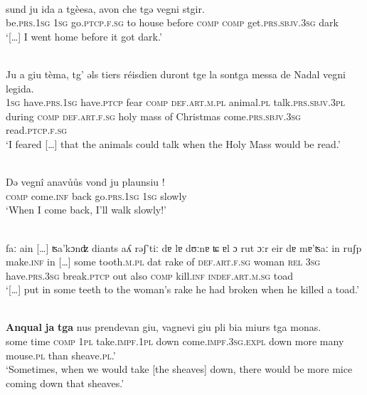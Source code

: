 \ea\label{ex:1:}
 {\citealt[17]{Büchli1966}}\\
\gll    sund ju ida a tgèesa, avon che tgǝ vegni stgir.\\
     be.\textsc{prs.1sg} \textsc{1sg} go.\textsc{ptcp.f.sg} to house before \textsc{comp} \textsc{comp} get.\textsc{prs.sbjv.3sg} dark \\
\glt `[…] I went home before it got dark.'
\z

\ea\label{ex:1:}
 {\citealt[19]{Büchli1966}}\\
\gll    Ju a giu tèma, tg’ ǝls tiers réisdien duront tge la sontga messa de Nadal vegni legida.\\
      \textsc{1sg} have.\textsc{prs.1sg} have.\textsc{ptcp} fear \textsc{comp} \textsc{def.art.m.pl} animal.\textsc{pl} talk.\textsc{prs.sbjv.3pl} during \textsc{comp} \textsc{def.art.f.sg} holy mass of Christmas come.\textsc{prs.sbjv.3sg} read.\textsc{ptcp.f.sg}\\
\glt `I feared […] that the animals could talk when the Holy Mass would be read.'
\z

\ea\label{}
\\
\gll    Dǝ vegnî anavůůs vond ju plaunsiu !\\
    \textsc{comp} come.\textsc{inf} back go.\textsc{prs.1sg} \textsc{1sg} slowly \\
\glt `When I come back, I’ll walk slowly!'
\z

\ea\label{}
\\
\gll    […] faː ain […] ʦa’kɔnʣ diants aʎ rǝʃ’tiː dɐ lɐ dʊːnɐ ʨ ɐl ɔ rut ɔːr eir dɐ mɐ’ʦaː in ruʃp\\
    […] make.\textsc{inf} in […] some tooth.\textsc{m.pl} {dat} rake of \textsc{def.art.f.sg} woman \textsc{rel} \textsc{3sg} have.\textsc{prs.3sg} break.\textsc{ptcp} out also \textsc{comp} kill.\textsc{inf} \textsc{indef.art.m.sg} toad\\
\glt `[…] put in some teeth to the woman’s rake he had broken when he killed a toad.'
\z

\ea\label{}
\\
\gll \textbf{Anqual} \textbf{ja} \textbf{tga} nus prendevan giu, vagnevi giu pli bia miurs tga monas.\\
   some time \textsc{comp} \textsc{1pl} take.\textsc{impf.1pl} down come.\textsc{impf.3sg.expl} down more many mouse.\textsc{pl} than sheave.\textsc{pl}.'\\
\glt `Sometimes, when we would take [the sheaves] down, there would be more mice coming down that sheaves.'
\z



